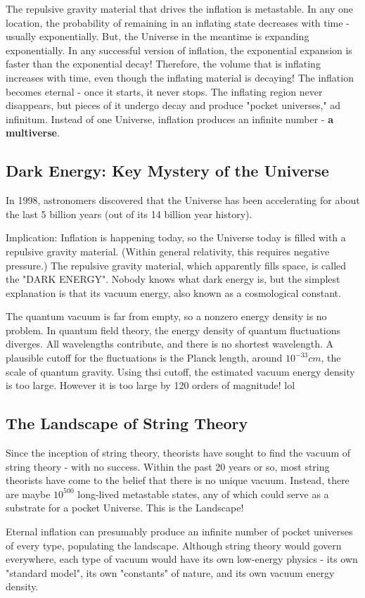 The repulsive gravity material that drives the inflation is metastable. In any one location, the probability of remaining in an inflating state decreases with time - usually exponentially. But, the Universe in the meantime is expanding exponentially. In any successful version of inflation, the exponential expansion is faster than the exponential decay! Therefore, the volume that is inflating increases with time, even though the inflating material is decaying! The inflation becomes eternal - once it starts, it never stops. The inflating region never disappears, but pieces of it undergo decay and produce "pocket universes," ad infinitum. Instead of one Universe, inflation produces an infinite number - \textbf{a multiverse}.


\subsection*{Dark Energy: Key Mystery of the Universe}

In 1998, astronomers discovered that the Universe has been accelerating for about the last 5 billion years (out of its 14 billion year history).

Implication: Inflation is happening today, so the Universe today is filled with a repulsive gravity material. (Within general relativity, this requires negative pressure.) The repulsive gravity material, which apparently fills space, is called the "DARK ENERGY". Nobody knows what dark energy is, but the simplest explanation is that its vacuum energy, also known as a cosmological constant.

The quantum vacuum is far from empty, so a nonzero energy density is no problem. In quantum field theory, the energy density of quantum fluctuations diverges. All wavelengths contribute, and there is no shortest wavelength. A plausible cutoff for the fluctuations is the Planck length, around $10^{-33}cm$, the scale of quantum gravity. Using thsi cutoff, the estimated vacuum energy density is too large. However it is too large by 120 orders of magnitude! lol


\subsection*{The Landscape of String Theory}

Since the inception of string theory, theorists have sought to find the vacuum of string theory - with no success. Within the past 20 years or so, most string theorists have come to the belief that there is no unique vacuum. Instead, there are maybe $10^{500}$ long-lived metastable states, any of which could serve as a substrate for a pocket Universe. This is the Landscape!

Eternal inflation can presumably produce an infinite number of pocket universes of every type, populating the landscape. Although string theory would govern everywhere, each type of vacuum would have its own low-energy physics - its own "standard model", its own "constants" of nature, and its own vacuum energy density.